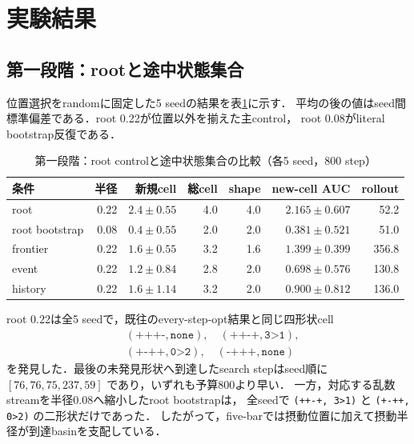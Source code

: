 \documentclass[a4paper,11pt]{ltjsarticle}
\newcommand{\code}[1]{\nolinkurl{#1}}
\begin{document}
\section{実験結果}
\label{sec:results}

\subsection{第一段階：rootと途中状態集合}

位置選択をrandomに固定した5 seedの結果を表\ref{tab:stage1-results}に示す．
平均の後の値はseed間標準偏差である．root 0.22が位置以外を揃えた主control，
root 0.08がliteral bootstrap反復である．

\begin{table}[H]
\centering
\caption{第一段階：root controlと途中状態集合の比較（各5 seed，800 step）}
\label{tab:stage1-results}
\small
\begin{tabular}{lrrrrrr}
\toprule
条件 & 半径 & 新規cell & 総cell & shape & new-cell AUC & rollout\\
\midrule
root & 0.22 & $2.4\pm0.55$ & 4.0 & 4.0 & $2.165\pm0.607$ & 52.2\\
root bootstrap & 0.08 & $0.4\pm0.55$ & 2.0 & 2.0 & $0.381\pm0.521$ & 51.0\\
frontier & 0.22 & $1.6\pm0.55$ & 3.2 & 1.6 & $1.399\pm0.399$ & 356.8\\
event & 0.22 & $1.2\pm0.84$ & 2.8 & 2.0 & $0.698\pm0.576$ & 130.8\\
history & 0.22 & $1.6\pm1.14$ & 3.2 & 2.0 & $0.900\pm0.812$ & 136.0\\
\bottomrule
\end{tabular}
\end{table}

root 0.22は全5 seedで，既往のevery-step-opt結果と同じ四形状cell
\begin{equation}
\begin{split}
 &(\texttt{+++-},\texttt{none}),\quad
 (\texttt{++-+},\texttt{3>1}),\\
 &(\texttt{+-++},\texttt{0>2}),\quad
 (\texttt{-+++},\texttt{none})
\end{split}
\label{eq:four-known-cells}
\end{equation}
を発見した．最後の未発見形状へ到達したsearch stepはseed順に
\([76,76,75,237,59]\) であり，いずれも予算800より早い．
一方，対応する乱数streamを半径0.08へ縮小したroot bootstrapは，
全seedで \code{(++-+, 3>1)} と
\code{(+-++, 0>2)} の二形状だけであった．
したがって，five-barでは摂動位置に加えて摂動半径が到達basinを支配している．
\end{document}
